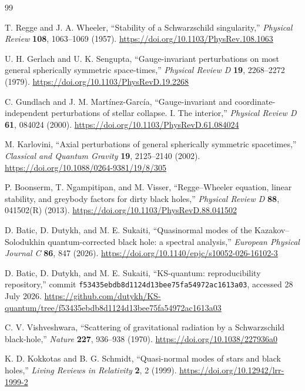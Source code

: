 \documentclass[12pt,a4paper]{article}
\begin{document}
\begin{thebibliography}{99}

T. Regge and J. A. Wheeler,
``Stability of a Schwarzschild singularity,''
\emph{Physical Review} \textbf{108}, 1063--1069 (1957).
\url{https://doi.org/10.1103/PhysRev.108.1063}

U. H. Gerlach and U. K. Sengupta,
``Gauge-invariant perturbations on most general spherically symmetric
space-times,''
\emph{Physical Review D} \textbf{19}, 2268--2272 (1979).
\url{https://doi.org/10.1103/PhysRevD.19.2268}

C. Gundlach and J. M. Mart\'inez-Garc\'ia,
``Gauge-invariant and coordinate-independent perturbations of stellar
collapse. I. The interior,''
\emph{Physical Review D} \textbf{61}, 084024 (2000).
\url{https://doi.org/10.1103/PhysRevD.61.084024}

M. Karlovini,
``Axial perturbations of general spherically symmetric spacetimes,''
\emph{Classical and Quantum Gravity} \textbf{19}, 2125--2140 (2002).
\url{https://doi.org/10.1088/0264-9381/19/8/305}

P. Boonserm, T. Ngampitipan, and M. Visser,
``Regge--Wheeler equation, linear stability, and greybody factors for dirty
black holes,''
\emph{Physical Review D} \textbf{88}, 041502(R) (2013).
\url{https://doi.org/10.1103/PhysRevD.88.041502}

D. Batic, D. Dutykh, and M. E. Sukaiti,
``Quasinormal modes of the Kazakov--Solodukhin quantum-corrected black hole:
a spectral analysis,''
\emph{European Physical Journal C} \textbf{86}, 847 (2026).
\url{https://doi.org/10.1140/epjc/s10052-026-16102-3}

D. Batic, D. Dutykh, and M. E. Sukaiti,
``KS-quantum: reproducibility repository,'' commit
\nolinkurl{f53435ebdb8d1124d13bee75fa54972ac1613a03}, accessed 28 July 2026.
\url{https://github.com/dutykh/KS-quantum/tree/f53435ebdb8d1124d13bee75fa54972ac1613a03}

C. V. Vishveshwara,
``Scattering of gravitational radiation by a Schwarzschild black-hole,''
\emph{Nature} \textbf{227}, 936--938 (1970).
\url{https://doi.org/10.1038/227936a0}

K. D. Kokkotas and B. G. Schmidt,
``Quasi-normal modes of stars and black holes,''
\emph{Living Reviews in Relativity} \textbf{2}, 2 (1999).
\url{https://doi.org/10.12942/lrr-1999-2}


\end{thebibliography}
\end{document}
